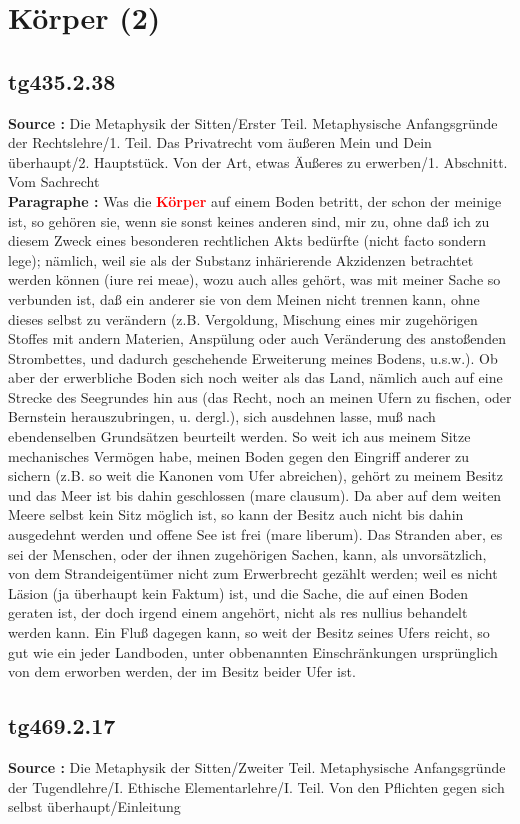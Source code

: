 \documentclass[a4paper,12pt,twoside]{book}
\newcommand{\match}[1]{\textcolor{red}{\textbf{#1}}}
\newcommand{\unnumberedsection}[1]{
	\section*{#1}
	\addcontentsline{toc}{section}{#1}
	\markright{#1}
}
\begin{document}
	\unnumberedsection{Körper (2)} 
	\subsection*{tg435.2.38} 
	\textbf{Source : }Die Metaphysik der Sitten/Erster Teil. Metaphysische Anfangsgründe der Rechtslehre/1. Teil. Das Privatrecht vom äußeren Mein und Dein überhaupt/2. Hauptstück. Von der Art, etwas Äußeres zu erwerben/1. Abschnitt. Vom Sachrecht\\  
	
	\textbf{Paragraphe : }Was die \match{Körper} auf einem Boden betritt, der schon der meinige ist, so gehören sie, wenn sie sonst keines anderen sind, mir zu, ohne daß ich zu diesem Zweck eines besonderen rechtlichen Akts bedürfte (nicht facto sondern lege); nämlich, weil sie als der Substanz inhärierende Akzidenzen betrachtet werden können (iure rei  meae), wozu auch alles gehört, was mit meiner Sache so verbunden ist, daß ein anderer sie von dem Meinen nicht trennen kann, ohne dieses selbst zu verändern (z.B. Vergoldung, Mischung eines mir zugehörigen Stoffes mit andern Materien, Anspülung oder auch Veränderung des anstoßenden Strombettes, und dadurch geschehende Erweiterung meines Bodens, u.s.w.). Ob aber der erwerbliche Boden sich noch weiter als das Land, nämlich auch auf eine Strecke des Seegrundes hin aus (das Recht, noch an meinen Ufern zu fischen, oder Bernstein herauszubringen, u. dergl.), sich ausdehnen lasse, muß nach ebendenselben Grundsätzen beurteilt werden. So weit ich aus meinem Sitze mechanisches Vermögen habe, meinen Boden gegen den Eingriff anderer zu sichern (z.B. so weit die Kanonen vom Ufer abreichen), gehört zu meinem Besitz und das Meer ist bis dahin geschlossen (mare clausum). Da aber auf dem weiten Meere selbst kein Sitz möglich ist, so kann der Besitz auch nicht bis dahin ausgedehnt werden und offene See ist frei (mare liberum). Das Stranden aber, es sei der Menschen, oder der ihnen zugehörigen Sachen, kann, als unvorsätzlich, von dem Strandeigentümer nicht zum Erwerbrecht gezählt werden; weil es nicht Läsion (ja überhaupt kein Faktum) ist, und die Sache, die auf einen Boden geraten ist, der doch irgend einem angehört, nicht als res nullius behandelt werden kann. Ein Fluß dagegen kann, so weit der Besitz seines Ufers reicht, so gut wie ein jeder Landboden, unter obbenannten Einschränkungen ursprünglich von dem erworben werden, der im Besitz beider Ufer ist. 
	
	\subsection*{tg469.2.17} 
	\textbf{Source : }Die Metaphysik der Sitten/Zweiter Teil. Metaphysische Anfangsgründe der Tugendlehre/I. Ethische Elementarlehre/I. Teil. Von den Pflichten gegen sich selbst überhaupt/Einleitung\\  
	
\end{document}
